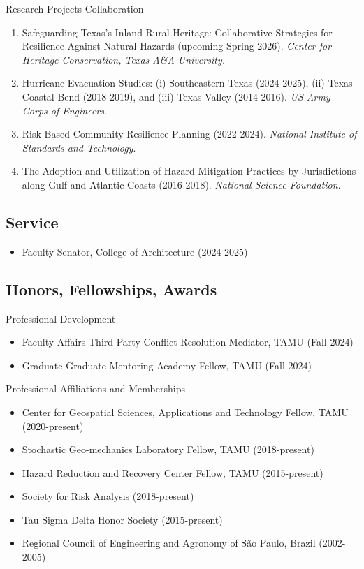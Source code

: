 \documentclass[11pt,oneside]{article}
\begin{document}
\vspace{3pt}

{Research Projects Collaboration}
\begin{enumerate}[leftmargin=20pt]
\item Safeguarding Texas's Inland Rural Heritage: Collaborative Strategies for Resilience Against Natural Hazards (upcoming Spring 2026). \emph{Center for Heritage Conservation, Texas A\&A University.}
\item Hurricane Evacuation Studies: (i) Southeastern Texas (2024-2025), (ii) Texas Coastal Bend (2018-2019), and (iii) Texas Valley (2014-2016). \emph{US Army Corps of Engineers}.
\item Risk-Based Community Resilience Planning (2022-2024). \emph{National Institute of Standards and Technology}.
\item The Adoption and Utilization of Hazard Mitigation Practices by Jurisdictions along Gulf and Atlantic Coasts (2016-2018). \emph{National Science Foundation}.
\end{enumerate}

\subsection*{Service}
\begin{itemize}[leftmargin=20pt]
\item Faculty Senator, College of Architecture (2024-2025)
\end{itemize}

\subsection*{Honors, Fellowships, Awards}

{Professional Development}
\begin{itemize}[leftmargin=20pt]
\item Faculty Affairs Third-Party Conflict Resolution Mediator, TAMU (Fall 2024)
\item Graduate Graduate Mentoring Academy Fellow, TAMU (Fall 2024)
\end{itemize}

\vspace{3pt}

{Professional Affiliations and Memberships}
\begin{itemize}[leftmargin=20pt]
\item Center for Geospatial Sciences, Applications and Technology Fellow, TAMU (2020-present)
\item Stochastic Geo-mechanics Laboratory Fellow, TAMU (2018-present)
\item Hazard Reduction and Recovery Center Fellow, TAMU (2015-present)
\item Society for Risk Analysis (2018-present)
\item Tau Sigma Delta Honor Society (2015-present)
\item Regional Council of Engineering and Agronomy of São Paulo, Brazil (2002-2005)
\end{itemize}
\end{document}
